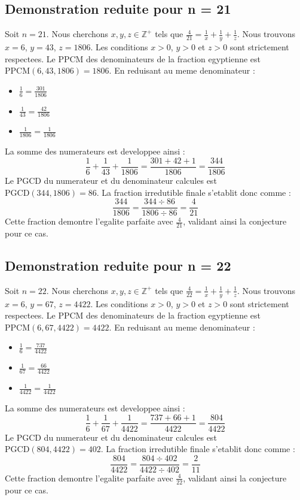 \documentclass[11pt,a4paper]{article}
\begin{document}
\subsection{Demonstration reduite pour n = 21}
Soit $n = 21$. Nous cherchons $x, y, z \in \mathbb{Z}^{+}$ tels que $\frac{4}{21} = \frac{1}{x} + \frac{1}{y} + \frac{1}{z}$.
Nous trouvons $x = 6$, $y = 43$, $z = 1806$.
Les conditions $x > 0$, $y > 0$ et $z > 0$ sont strictement respectees.
Le PPCM des denominateurs de la fraction egyptienne est $\text{PPCM}(6, 43, 1806) = 1806$.
En reduisant au meme denominateur :
\begin{itemize}
    \item $\frac{1}{6} = \frac{301}{1806}$
    \item $\frac{1}{43} = \frac{42}{1806}$
    \item $\frac{1}{1806} = \frac{1}{1806}$
\end{itemize}
La somme des numerateurs est developpee ainsi :
$$ \frac{1}{6} + \frac{1}{43} + \frac{1}{1806} = \frac{301 + 42 + 1}{1806} = \frac{344}{1806} $$
Le PGCD du numerateur et du denominateur calcules est $\text{PGCD}(344, 1806) = 86$.
La fraction irredutible finale s'etablit donc comme :
$$ \frac{344}{1806} = \frac{344 \div 86}{1806 \div 86} = \frac{4}{21} $$
Cette fraction demontre l'egalite parfaite avec $\frac{4}{21}$, validant ainsi la conjecture pour ce cas.

\subsection{Demonstration reduite pour n = 22}
Soit $n = 22$. Nous cherchons $x, y, z \in \mathbb{Z}^{+}$ tels que $\frac{4}{22} = \frac{1}{x} + \frac{1}{y} + \frac{1}{z}$.
Nous trouvons $x = 6$, $y = 67$, $z = 4422$.
Les conditions $x > 0$, $y > 0$ et $z > 0$ sont strictement respectees.
Le PPCM des denominateurs de la fraction egyptienne est $\text{PPCM}(6, 67, 4422) = 4422$.
En reduisant au meme denominateur :
\begin{itemize}
    \item $\frac{1}{6} = \frac{737}{4422}$
    \item $\frac{1}{67} = \frac{66}{4422}$
    \item $\frac{1}{4422} = \frac{1}{4422}$
\end{itemize}
La somme des numerateurs est developpee ainsi :
$$ \frac{1}{6} + \frac{1}{67} + \frac{1}{4422} = \frac{737 + 66 + 1}{4422} = \frac{804}{4422} $$
Le PGCD du numerateur et du denominateur calcules est $\text{PGCD}(804, 4422) = 402$.
La fraction irredutible finale s'etablit donc comme :
$$ \frac{804}{4422} = \frac{804 \div 402}{4422 \div 402} = \frac{2}{11} $$
Cette fraction demontre l'egalite parfaite avec $\frac{4}{22}$, validant ainsi la conjecture pour ce cas.
\end{document}
